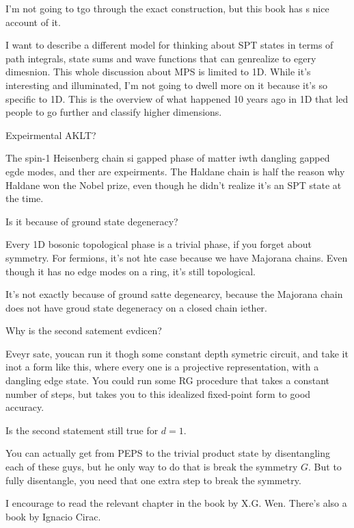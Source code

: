 I'm not going to tgo through the exact construction,
but this book has s nice account of it.

I want to describe a different model for thinking about SPT states in terms of
path integrals,
state sums and wave functions that can genrealize to egery dimesnion.
This whole discussion about MPS is limited to 1D.
While it's interesting and illuminated,
I'm not going to dwell more on it because it's so specific to 1D.
This is the overview of what happened 10 years ago in 1D that led people to go
further and classify higher dimensions.

\begin{qeustion}
    Expeirmental AKLT?
\end{qeustion}
The spin-1 Heisenberg chain si  gapped phase of matter iwth dangling gapped egde
modes,
and ther are expeirments.
The Haldane chain is half the reason why Haldane won the Nobel prize,
even though he didn't realize it's an SPT state at the time.

\begin{question}
    Is it because of ground state degeneracy?
\end{question}
Every 1D bosonic topological phase is a trivial phase,
if you forget about symmetry.
For fermions,
it's not hte case because we have Majorana chains.
Even though it has no edge modes on a ring,
it's still topological.

It's not exactly because of ground satte degenearcy,
because the Majorana chain does not have groud state degeneracy on a closed
chain iether.

\begin{question}
    Why is the second satement evdicen?
\end{question}
Eveyr sate,
youcan run it thogh some constant depth symetric circuit,
and take it inot a form like this,
where every one is a projective representation,
with a dangling edge state.
You could run some RG procedure that takes a constant number of steps,
but takes you to this idealized fixed-point form to good accuracy.

\begin{qeustion}
    Is the second statement still true for $d=1$.
\end{qeustion}
You can actually get from PEPS to the trivial product state by disentangling each
of these guys,
but he only way to do that is break the symmetry $G$.
But to fully disentangle,
you need that one extra step to break the symmetry.

I encourage to read the relevant chapter in the book by X.G. Wen.
There's also a book by Ignacio Cirac.

